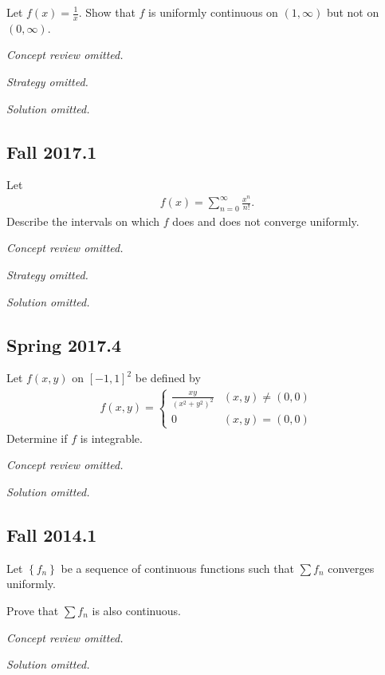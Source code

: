 Let \(f(x) = \frac 1 x\). Show that \(f\) is uniformly continuous on
\((1, \infty)\) but not on \((0,\infty)\).

\emph{Concept review omitted.}

\emph{Strategy omitted.}

\emph{Solution omitted.}

\hypertarget{fall-2017.1}{%
\subsection{Fall 2017.1}\label{fall-2017.1}}

Let
\begin{align*}
f(x) = \sum _{n=0}^{\infty} \frac{x^{n}}{n !}.
\end{align*}
Describe the intervals on which \(f\) does and does not converge
uniformly.

\emph{Concept review omitted.}

\emph{Strategy omitted.}

\emph{Solution omitted.}

\hypertarget{spring-2017.4}{%
\subsection{Spring 2017.4}\label{spring-2017.4}}

Let \(f(x, y)\) on \([-1, 1]^2\) be defined by
\begin{align*}
f(x, y) = \begin{cases}
\frac{x y}{\left(x^{2}+y^{2}\right)^{2}} & (x, y) \neq (0, 0) \\
0 & (x, y) = (0, 0)
\end{cases}
\end{align*}
Determine if \(f\) is integrable.

\emph{Concept review omitted.}

\emph{Solution omitted.}

\hypertarget{fall-2014.1}{%
\subsection{Fall 2014.1}\label{fall-2014.1}}

Let \(\left\{{f_n}\right\}\) be a sequence of continuous functions such
that \(\sum f_n\) converges uniformly.

Prove that \(\sum f_n\) is also continuous.

\emph{Concept review omitted.}

\emph{Solution omitted.}


